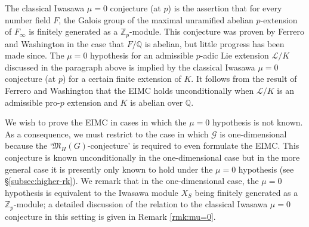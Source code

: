 \documentclass[12pt]{amsart}
\theoremstyle{plain}
\theoremstyle{remark}
\theoremstyle{definition}
\numberwithin{equation}{section}
\begin{document}
The classical Iwasawa $\mu=0$ conjecture (at $p$) is the assertion that for every number field $F$, the
Galois group of the maximal unramified abelian $p$-extension of $F_{\infty}$ is finitely generated as a ${\mathbb{Z}}_{p}$-module.
This conjecture was proven by Ferrero and Washington \cite{MR528968} in the case that $F/{\mathbb{Q}}$ is abelian, but little progress has been made since.
The $\mu=0$ hypothesis for an admissible $p$-adic Lie extension $\mathcal{L}/K$ discussed in the paragraph above 
is implied by the classical Iwasawa $\mu=0$ conjecture (at $p$) for a certain finite extension of $K$.
It follows from the result of Ferrero and Washington that the EIMC holds unconditionally when $\mathcal{L}/K$ 
is an admissible pro-$p$ extension and $K$ is abelian over ${\mathbb{Q}}$.

We wish to prove the EIMC in cases in which the $\mu=0$ hypothesis is not known. 
As a consequence, we must restrict to the case in which $\mathcal{G}$ is one-dimensional because the
`$\mathfrak{M}_{H}(G)$-conjecture' is required to even formulate the EIMC. 
This conjecture is known unconditionally in the one-dimensional case but in the more general case it is 
presently only known to hold under the $\mu=0$ hypothesis (see \S \ref{subsec:higher-rk}).
We remark that in the one-dimensional case, the $\mu=0$ hypothesis is equivalent to 
the Iwasawa module $X_{S}$ being finitely generated as a ${\mathbb{Z}}_{p}$-module; 
a detailed discussion of the relation to the classical Iwasawa $\mu=0$ conjecture in this setting is given in Remark \ref{rmk:mu=0}.
\end{document}
